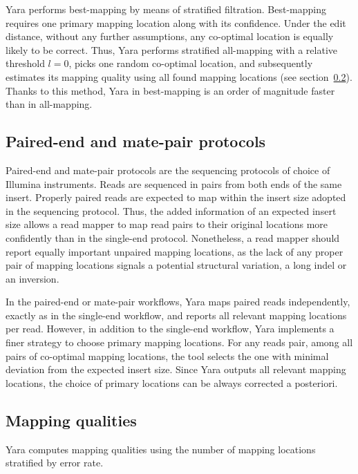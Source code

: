 Yara performs best-mapping by means of stratified filtration.
Best-mapping requires one primary mapping location along with its confidence.
Under the edit distance, without any further assumptions, any co-optimal location is equally likely to be correct.
Thus, Yara performs stratified all-mapping with a relative threshold $l=0$, picks one random co-optimal location, and subsequently estimates its mapping quality using all found mapping locations (see section~\ref{sec:yara:eng:qualities}).
Thanks to this method, Yara in best-mapping is an order of magnitude faster than in all-mapping.



\subsection{Paired-end and mate-pair protocols}
\label{sec:yara:eng:pairs}
Paired-end and mate-pair protocols are the sequencing protocols of choice of Illumina instruments.
Reads are sequenced in pairs from both ends of the same insert.
Properly paired reads are expected to map within the insert size adopted in the sequencing protocol.
Thus, the added information of an expected insert size allows a read mapper to map read pairs to their original locations more confidently than in the single-end protocol.
Nonetheless, a read mapper should report equally important unpaired mapping locations, as the lack of any proper pair of mapping locations signals a potential structural variation, \eg a long indel or an inversion.

In the paired-end or mate-pair workflows, Yara maps paired reads independently, exactly as in the single-end workflow, and reports all relevant mapping locations per read.
However, in addition to the single-end workflow, Yara implements a finer strategy to choose primary mapping locations.
For any reads pair, among all pairs of co-optimal mapping locations, the tool selects the one with minimal deviation from the expected insert size.
Since Yara outputs all relevant mapping locations, the choice of primary locations can be always corrected a posteriori.

\subsection{Mapping qualities}
\label{sec:yara:eng:qualities}
Yara computes mapping qualities using the number of mapping locations stratified by error rate.

